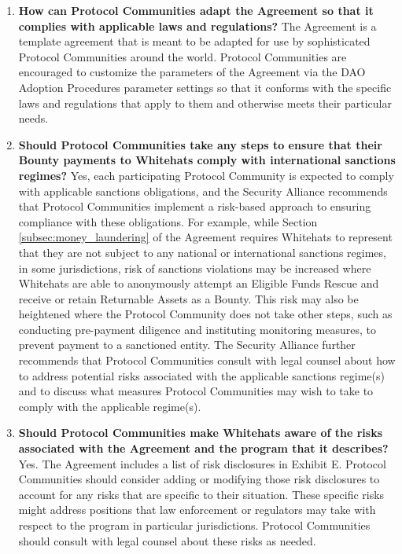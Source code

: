 \begin{enumerate}
    \item \textbf{How can Protocol Communities adapt the Agreement so that it complies with applicable laws and regulations?} The Agreement is a template agreement that is meant to be adapted for use by sophisticated Protocol Communities around the world. Protocol Communities are encouraged to customize the parameters of the Agreement via the DAO Adoption Procedures parameter settings so that it conforms with the specific laws and regulations that apply to them and otherwise meets their particular needs.

    \item \textbf{Should Protocol Communities take any steps to ensure that their Bounty payments to Whitehats comply with international sanctions regimes?} Yes, each participating Protocol Community is expected to comply with applicable sanctions obligations, and the Security Alliance recommends that Protocol Communities implement a risk-based approach to ensuring compliance with these obligations. For example, while Section \ref{subsec:money_laundering} of the Agreement requires Whitehats to represent that they are not subject to any national or international sanctions regimes, in some jurisdictions, risk of sanctions violations may be increased where Whitehats are able to anonymously attempt an Eligible Funds Rescue and receive or retain Returnable Assets as a Bounty. This risk may also be heightened where the Protocol Community does not take other steps, such as conducting pre-payment diligence and instituting monitoring measures, to prevent payment to a sanctioned entity. The Security Alliance further recommends that Protocol Communities consult with legal counsel about how to address potential risks associated with the applicable sanctions regime(s) and to discuss what measures Protocol Communities may wish to take to comply with the applicable regime(s).

    \item \textbf{Should Protocol Communities make Whitehats aware of the risks associated with the Agreement and the program that it describes?} Yes. The Agreement includes a list of risk disclosures in Exhibit E. Protocol Communities should consider adding or modifying those risk disclosures to account for any risks that are specific to their situation. These specific risks might address positions that law enforcement or regulators may take with respect to the program in particular jurisdictions. Protocol Communities should consult with legal counsel about these risks as needed.
\end{enumerate}